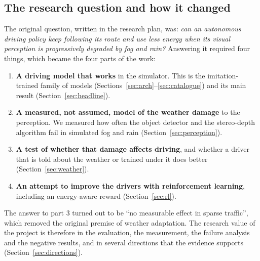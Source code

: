 \subsection{The research question and how it changed}
The original question, written in the research plan, was: \emph{can an autonomous driving policy keep following its route and use less energy when its visual perception is progressively degraded by fog and rain?} Answering it required four things, which became the four parts of the work:
\begin{enumerate}
\item \textbf{A driving model that works} in the simulator. This is the imitation-trained family of models (Sections~\ref{sec:arch}--\ref{sec:catalogue}) and its main result (Section~\ref{sec:headline}).
\item \textbf{A measured, not assumed, model of the weather damage} to the perception. We measured how often the object detector and the stereo-depth algorithm fail in simulated fog and rain (Section~\ref{sec:perception}).
\item \textbf{A test of whether that damage affects driving}, and whether a driver that is told about the weather or trained under it does better (Section~\ref{sec:weather}).
\item \textbf{An attempt to improve the drivers with reinforcement learning}, including an energy-aware reward (Section~\ref{sec:rl}).
\end{enumerate}
The answer to part 3 turned out to be ``no measurable effect in sparse traffic'', which removed the original premise of weather adaptation. The research value of the project is therefore in the evaluation, the measurement, the failure analysis and the negative results, and in several directions that the evidence supports (Section~\ref{sec:directions}).

